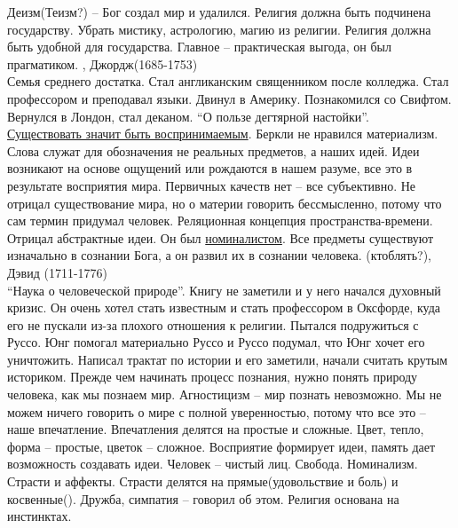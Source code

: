 \documentclass[a4paper,12pt]{report} %
\begin{document}
\begin{itemize}
\begin{itemize}
Деизм(Теизм?) -- Бог создал мир и удалился. Религия должна быть
подчинена государству. Убрать мистику, астрологию, магию из
религии. Религия должна быть удобной для государства. Главное --
практическая выгода, он был прагматиком.
, Джордж(1685-1753)\\
Семья среднего достатка. Стал англиканским священником после
колледжа. Стал профессором и преподавал языки. Двинул в
Америку. Познакомился со Свифтом. Вернулся в Лондон, стал деканом. ``О
пользе дегтярной настойки''.\\
\underline{Существовать значит быть воспринимаемым}. Беркли не нравился
материализм. Слова служат для обозначения не реальных предметов, а
наших идей. Идеи возникают на основе ощущений или рождаются в нашем
разуме, все это в результате восприятия мира. Первичных качеств нет --
все субъективно. Не отрицал существование мира, но о материи говорить
бессмысленно, потому что сам термин придумал человек. Реляционная
концепция пространства-времени. Отрицал абстрактные идеи. Он был
\underline{номиналистом}. Все предметы существуют изначально в
сознании Бога, а он развил их в сознании человека. 
(ктоблять?), Дэвид (1711-1776)\\
``Наука о человеческой природе''. Книгу не заметили и у него начался
  духовный кризис. Он очень хотел стать известным и стать профессором
  в Оксфорде, куда его не пускали из-за плохого отношения к
  религии. Пытался подружиться с Руссо. Юнг помогал материально Руссо
  и Руссо подумал, что Юнг хочет его уничтожить. Написал трактат по
  истории и его заметили, начали считать крутым историком. Прежде чем
  начинать процесс познания, нужно понять природу человека, как мы
  познаем мир. Агностицизм -- мир познать невозможно. Мы не можем
  ничего говорить о мире с полной уверенностью, потому что все это --
  наше впечатление. Впечатления делятся на простые и сложные. Цвет,
  тепло, форма -- простые, цветок -- сложное. Восприятие формирует
  идеи, память дает возможность создавать идеи. Человек -- чистый
  лиц. Свобода. Номинализм. Страсти и аффекты. Страсти
  делятся на прямые(удовольствие и боль) и косвенные(). Дружба,
  симпатия -- говорил об этом. Религия основана на инстинктах.
\end{itemize}
\end{itemize}
\end{document}
